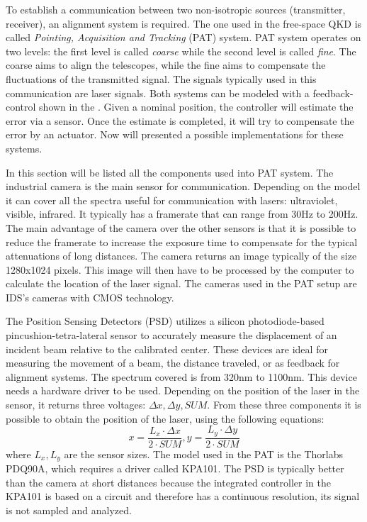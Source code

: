 To establish a communication between two non-isotropic sources (transmitter, receiver), an alignment system is required. The one used in the free-space QKD is called \textit{Pointing, Acquisition and Tracking} (PAT) system. PAT system operates on two levels: the first level is called \textit{coarse} while the second level is called \textit{fine}.
The coarse aims to align the telescopes, while the fine aims to compensate the fluctuations of the transmitted signal. The signals typically used in this communication are laser signals. Both systems can be modeled with a feedback-control shown in the .
Given a nominal position, the controller will estimate the error via a sensor. Once the estimate is completed, it will try to compensate the error by an actuator.
Now will presented a possible implementations for these systems.

In this section will be listed all the components used into PAT system.
The industrial camera is the main sensor for communication. Depending on the model it can cover all the spectra useful for communication with lasers: ultraviolet, visible, infrared.
It typically has a framerate that can range from 30Hz to 200Hz. The main advantage of the camera over the other sensors is that it is possible to reduce the framerate to increase the exposure time to compensate for the typical attenuations of long distances.
The camera returns an image typically of the size 1280x1024 pixels. This image will then have to be processed by the computer to calculate the location of the laser signal.
The cameras used in the PAT setup are IDS's cameras with CMOS technology.

The Position Sensing Detectors (PSD) utilizes a silicon photodiode-based pincushion-tetra-lateral sensor to accurately measure the displacement of an incident beam relative to the calibrated center. These devices are ideal for measuring the movement of a beam, the distance traveled, or as feedback for alignment systems.
The spectrum covered is from 320nm to 1100nm. This device needs a hardware driver to be used. Depending on the position of the laser in the sensor, it returns three voltages: $\Delta x, \Delta y, SUM$.
From these three components it is possible to obtain the position of the laser, using the following equations:
$$x = \frac{L_x \cdot \Delta x}{2 \cdot SUM}, y = \frac{L_y \cdot \Delta y}{2 \cdot  SUM}$$
where $L_x,L_y$ are the sensor sizes. The model used in the PAT is the Thorlabs PDQ90A, which requires a driver called KPA101.
The PSD is typically better than the camera at short distances because the integrated controller in the KPA101 is based on a circuit and therefore has a continuous resolution, its signal is not sampled and analyzed.

